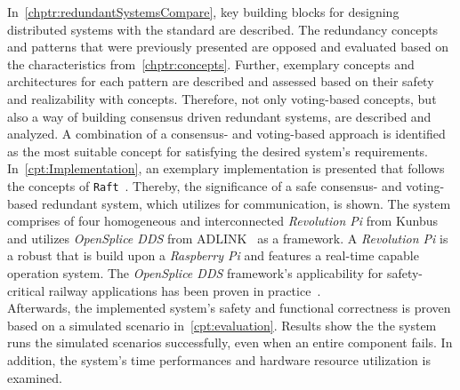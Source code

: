 In~\autoref{chptr:redundantSystemsCompare}, key building blocks for designing distributed systems with the  standard are described.
The redundancy concepts and patterns that were previously presented are opposed and evaluated based on the characteristics from~\autoref{chptr:concepts}.
Further, exemplary concepts and architectures for each pattern are described and assessed based on their safety and realizability with  concepts.
Therefore, not only voting-based concepts, but also a way of building consensus driven redundant systems, are described and analyzed.
A combination of a consensus- and voting-based approach is identified as the most suitable concept for satisfying the desired system's requirements.
\\

In~\autoref{cpt:Implementation}, an exemplary implementation is presented that follows the concepts of \texttt{Raft}~\cite{RaftConsensusPaper}.
Thereby, the significance of a safe consensus- and voting-based redundant system, which utilizes  for communication, is shown.
The system comprises of four homogeneous and interconnected \textit{Revolution Pi} from Kunbus~\cite{Kunbus} and utilizes \textit{OpenSplice DDS} from ADLINK~\cite{VortexOpenSplice} as a  framework.
A \textit{Revolution Pi} is a robust  that is build upon a \textit{Raspberry Pi} and features a real-time capable operation system.
The \textit{OpenSplice DDS} framework's applicability for safety-critical railway applications has been proven in practice~\cite{SchmidtMissionCriticalChallenges}.
\\

Afterwards, the implemented system's safety and functional correctness is proven based on a simulated  scenario in~\autoref{cpt:evaluation}.
Results show the the system runs the simulated scenarios successfully, even when an entire component fails.
In addition, the system's time performances and hardware resource utilization is examined.



